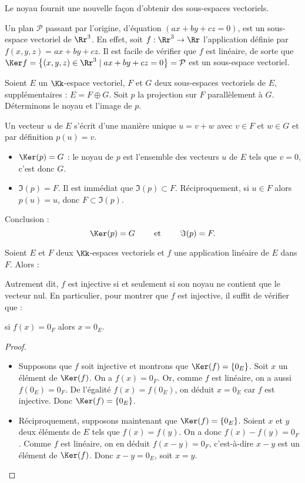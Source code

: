 \documentclass[class=report,crop=false]{standalone}
\begin{document}
\bigskip

Le noyau fournit une nouvelle façon d'obtenir des sous-espaces vectoriels.
\begin{exemple}
Un plan $\mathcal{P}$ passant par l'origine, d'équation $(ax+by+cz=0)$,
est un sous-espace vectoriel de $\Rr^3$.
En effet, soit $f : \Rr^3 \to \Rr$ l'application définie par $f(x,y,z)=ax+by+cz$.
Il est facile de vérifier que $f$ est linéaire, de sorte que
$\Ker f = \big\{ (x,y,z) \in \Rr^3 \mid ax+by+cz=0 \big\} = \mathcal{P}$
est un sous-espace vectoriel.
\end{exemple}


\begin{exemple}
Soient $E$ un $\Kk$-espace vectoriel, $F$ et $G$ deux sous-espaces vectoriels de $E$,
supplémentaires : $E = F \oplus G$.
Soit $p$ la projection sur $F$ parallèlement à $G$.
Déterminons le noyau et l'image de $p$.


Un vecteur $u$ de $E$ s'écrit d'une manière unique $u=v+w$
avec  $v \in F$ et $w \in G$ et par définition $p(u)=v$.
\begin{itemize}
  \item $\Ker(p) = G$ : le noyau de $p$ est l'ensemble des vecteurs $u$ de $E$
  tels que $v=0$, c'est donc $G$.

  \item $\Im (p) = F$. Il est immédiat que $\Im(p) \subset F$.
  Réciproquement, si $u \in F$ alors $p(u)=u$, donc $F \subset \Im (p)$.
\end{itemize}
Conclusion :
$$\Ker(p)=G \qquad \text{ et } \qquad  \Im(p)=F.$$
\end{exemple}


\begin{theoreme}
Soient $E$ et $F$ deux $\Kk$-espaces vectoriels et $f$ une application linéaire de $E$ dans $F$. Alors :
\end{theoreme}
Autrement dit, $f$ est injective si et seulement si son noyau ne contient que le vecteur nul.
En particulier, pour montrer que $f$ est injective, il suffit de vérifier que : \\
\centerline{si $f(x)=0_F$ alors $x=0_E$.}


\begin{proof}
~
\begin{itemize}
  \item Supposons que $f$ soit injective et montrons que $\Ker(f)=\{0_E\}$.
Soit $x$ un élément de $\Ker(f)$. On a $f(x)=0_{F}$. Or, comme $f$ est linéaire,
on a aussi $f(0_{E})=0_{F}$. De l'égalité $f(x)=f(0_{E})$, on déduit $x=0_{E}$
car $f$ est injective. Donc $\Ker (f)=\{0_{E}\}$.

  \item Réciproquement, supposons maintenant que $\Ker (f)=\{0_E\}$. Soient $x$ et $y$ deux éléments de $E$ tels que
$f(x)=f(y)$. On a donc $f(x)-f(y)=0_{F}$. Comme $f$ est linéaire, on en déduit
$f(x-y)=0_{F}$, c'est-à-dire $x-y$ est un élément de $\Ker (f)$. Donc $x-y=0_{E}$, soit $x=y$.
\end{itemize}
\end{proof}
\end{document}
